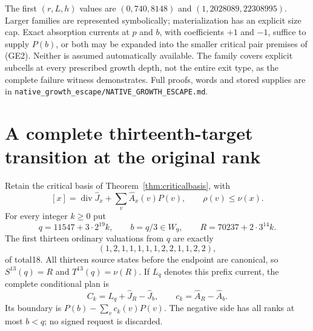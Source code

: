 \documentclass[11pt]{article}
\begin{document}
The first $(r,L,h)$ values are $(0,740,8148)$ and
$(1,2028089,22308995)$. Larger families are represented symbolically;
materialization has an explicit size cap. Exact absorption currents at
$p$ and $b$, with coefficients $+1$ and $-1$, suffice to supply $P(b)$,
or both may be expanded into the smaller critical pair premises of
(GE2). Neither is assumed automatically available.
The family covers explicit subcells at every prescribed growth depth,
not the entire exit type, as the complete failure witness demonstrates.
Full proofs, words and stored supplies are in
\texttt{native\_growth\_escape/NATIVE\_GROWTH\_ESCAPE.md}.

\section{A complete thirteenth-target transition at the original rank}
Retain the critical basis of Theorem~\ref{thm:criticalbasis}, with
\[
 [x]=\operatorname{div}\widehat J_x+
       \sum_v\widehat A_x(v)P(v),\qquad
 \rho(v)\le\nu(x).
\]
For every integer $k\ge0$ put
\[
 q=11547+3\cdot2^{19}k,\qquad b=q/3\in W_9,\qquad
 R=70237+2\cdot3^{14}k.
 \tag{HT1}
\]
The first thirteen ordinary valuations from $q$ are exactly
\[
 (1,2,1,1,1,1,1,2,2,1,1,2,2),
 \tag{HT2}
\]
of total18. All thirteen source states before the endpoint are
canonical, so $S^{13}(q)=R$ and $T^{13}(q)=\nu(R)$.
If $L_q$ denotes this prefix current, the complete conditional plan is
\[
 C_k=L_q+\widehat J_R-\widehat J_b,\qquad
 c_k=\widehat A_R-\widehat A_b.
 \tag{HT3}
\]
Its boundary is $P(b)-\sum_vc_k(v)P(v)$. The negative side has
all ranks at most $b<q$; no signed request is discarded.
\end{document}
